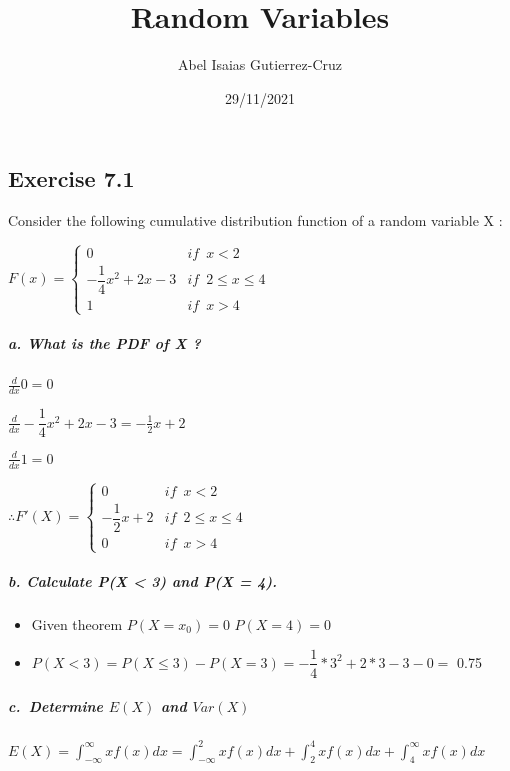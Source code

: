 \documentclass[
]{article}
\title{Random Variables}
\author{Abel Isaias Gutierrez-Cruz}
\date{29/11/2021}
\begin{document}
\maketitle

\hypertarget{exercise-7.1}{%
\subsection{Exercise 7.1}\label{exercise-7.1}}

Consider the following cumulative distribution function of a random
variable X :

\(F(x) = \left\{ \begin{array}{ll} 0 & if \enspace x < 2 \\ -\dfrac{1}{4}x^2 + 2x - 3 & if \enspace 2 \leq x \leq 4 \\ 1 & if \enspace x > 4 \end{array} \right.\)

\hypertarget{a.-what-is-the-pdf-of-x}{%
\subparagraph{a. What is the PDF of X ?}\label{a.-what-is-the-pdf-of-x}}

\(\frac{d}{dx}0 = 0\)

\(\frac{d}{dx} -\dfrac{1}{4}x^2 + 2x - 3 = - \frac{1}{2}x + 2\)

\(\frac{d}{dx} 1 = 0\)

\(\therefore F'(X) = \left\{ \begin{array}{ll} 0 & if \enspace x < 2 \\ -\dfrac{1}{2}x + 2 & if \enspace 2 \leq x \leq 4 \\ 0 & if \enspace x > 4 \end{array} \right.\)

\hypertarget{b.-calculate-px-3-and-px-4.}{%
\subparagraph{b. Calculate P(X \textless{} 3) and P(X =
4).}\label{b.-calculate-px-3-and-px-4.}}

\begin{itemize}
\item
  Given theorem \(P(X=x_0) = 0\) \(P(X=4) = 0\)
\item
  \(P(X<3) = P(X \leq 3) - P(X=3) = -\dfrac{1}{4}*3^2 + 2*3 - 3 - 0 =\)
  0.75
\end{itemize}

\hypertarget{c.-determine-ex-and-varx}{%
\subparagraph{\texorpdfstring{c.~Determine \(E(X)\) and
\(Var(X)\)}{c.~Determine E(X) and Var(X)}}\label{c.-determine-ex-and-varx}}

\(E(X) = \displaystyle{\int_{-\infty}^\infty x f(x) dx = \int_{-\infty}^2 xf(x)dx + \int_2^4 x f(x)dx + \int_4^\infty xf(x)dx}\)
\end{document}
